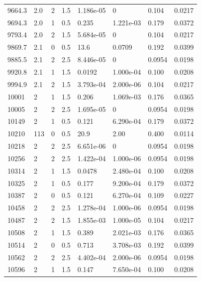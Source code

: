 \documentclass[preview]{standalone}
\begin{document}
{{{{{\begin{tabular}{L{1.2cm}C{1.2cm} C{0.3cm}C{0.5cm} C{1.4cm}C{1.4cm} C{1.4cm}C{1.4cm}}
  9664.3  &   2.0  & 2     & 1.5 &  1.186e-05  & 0  & 0.104 &  0.0217   \\ 
  9694.3  &   2.0  & 1     & 0.5 &  0.235  & 1.221e-03  & 0.179 &  0.0372   \\ 
  9793.4  &   2.0  & 2     & 1.5 &  5.684e-05  & 0  & 0.104 &  0.0217   \\ 
  9869.7  &   2.1  & 0     & 0.5 &  13.6  & 0.0709  & 0.192 &  0.0399   \\ 
  9885.5  &   2.1  & 2     & 2.5 &  8.446e-05  & 0  & 0.0954 &  0.0198   \\ 
  9920.8  &   2.1  & 1     & 1.5 &  0.0192  & 1.000e-04  & 0.100 &  0.0208   \\ 
  9994.9  &   2.1  & 2     & 1.5 &  3.793e-04  & 2.000e-06  & 0.104 &  0.0217   \\ 
  10001  &     2  & 1     & 1.5 &  0.206  & 1.069e-03  & 0.176 &  0.0365   \\ 
  10005  &     2  & 2     & 2.5 &  1.695e-05  & 0  & 0.0954 &  0.0198   \\ 
  10149  &     2  & 1     & 0.5 &  0.121  & 6.290e-04  & 0.179 &  0.0372   \\ 
  10210  &   113  & 0     & 0.5 &  20.9  & 2.00  & 0.400 &  0.0114   \\ 
  10218  &     2  & 2     & 2.5 &  6.651e-06  & 0  & 0.0954 &  0.0198   \\ 
  10256  &     2  & 2     & 2.5 &  1.422e-04  & 1.000e-06  & 0.0954 &  0.0198   \\ 
  10314  &     2  & 1     & 1.5 &  0.0478  & 2.480e-04  & 0.100 &  0.0208   \\ 
  10325  &     2  & 1     & 0.5 &  0.177  & 9.200e-04  & 0.179 &  0.0372   \\ 
  10387  &     2  & 0     & 0.5 &  0.121  & 6.270e-04  & 0.109 &  0.0227   \\ 
  10458  &     2  & 2     & 2.5 &  1.278e-04  & 1.000e-06  & 0.0954 &  0.0198   \\ 
  10487  &     2  & 2     & 1.5 &  1.855e-03  & 1.000e-05  & 0.104 &  0.0217   \\ 
  10508  &     2  & 1     & 1.5 &  0.389  & 2.021e-03  & 0.176 &  0.0365   \\ 
  10514  &     2  & 0     & 0.5 &  0.713  & 3.708e-03  & 0.192 &  0.0399   \\ 
  10562  &     2  & 2     & 2.5 &  4.402e-04  & 2.000e-06  & 0.0954 &  0.0198   \\ 
  10596  &     2  & 1     & 1.5 &  0.147  & 7.650e-04  & 0.100 &  0.0208   \\ 

\end{tabular}}}}}}
\end{document}
